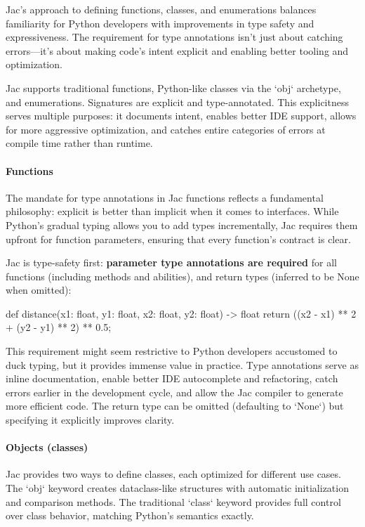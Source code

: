 Jac's approach to defining functions, classes, and enumerations balances familiarity for Python developers with improvements in type safety and expressiveness. The requirement for type annotations isn't just about catching errors—it's about making code's intent explicit and enabling better tooling and optimization.

Jac supports traditional functions, Python-like classes via the `obj` archetype, and enumerations. Signatures are explicit and type-annotated. This explicitness serves multiple purposes: it documents intent, enables better IDE support, allows for more aggressive optimization, and catches entire categories of errors at compile time rather than runtime.

\paragraph{Functions}

The mandate for type annotations in Jac functions reflects a fundamental philosophy: explicit is better than implicit when it comes to interfaces. While Python's gradual typing allows you to add types incrementally, Jac requires them upfront for function parameters, ensuring that every function's contract is clear.

Jac is type-safety first: \textbf{parameter type annotations are required} for all functions (including methods and abilities), and return types (inferred to be None when omitted):

\begin{jacblock}
def distance(x1: float, y1: float, x2: float, y2: float) -> float {
    return ((x2 - x1) ** 2 + (y2 - y1) ** 2) ** 0.5;
}
\end{jacblock}

This requirement might seem restrictive to Python developers accustomed to duck typing, but it provides immense value in practice. Type annotations serve as inline documentation, enable better IDE autocomplete and refactoring, catch errors earlier in the development cycle, and allow the Jac compiler to generate more efficient code. The return type can be omitted (defaulting to `None`) but specifying it explicitly improves clarity.

\paragraph{Objects (classes)}

Jac provides two ways to define classes, each optimized for different use cases. The `obj` keyword creates dataclass-like structures with automatic initialization and comparison methods. The traditional `class` keyword provides full control over class behavior, matching Python's semantics exactly.


